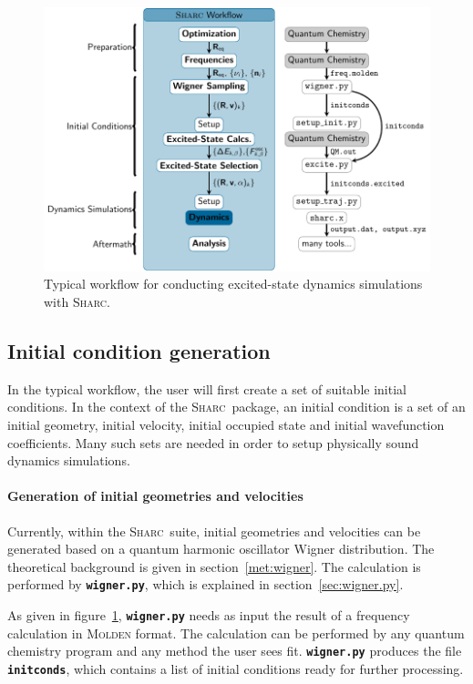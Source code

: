 \documentclass[a4paper,11pt,DIV=15,openany,twoside=false]{scrbook}
\newcommand{\sharc}{\textsc{Sharc}}
\newcommand{\ttt}[1]{\textbf{\texttt{#1}}}
\begin{document}
\begin{figure}[h!]
  \centering
  \includegraphics[scale=1]{img/workflow/prepare.pdf}
  \caption{Typical workflow for conducting excited-state dynamics simulations with \sharc.}
  \label{fig:workflow}
\end{figure}

\subsection{Initial condition generation}

In the typical workflow, the user will first create a set of suitable initial conditions. In the context of the \sharc\ package, an initial condition is a set of an initial geometry, initial velocity, initial occupied state and initial wavefunction coefficients. 
Many such sets are needed in order to setup physically sound dynamics simulations.

\paragraph{Generation of initial geometries and velocities}

Currently, within the \sharc\ suite, initial geometries and velocities can be generated based on a quantum harmonic oscillator Wigner distribution. The theoretical background is given in section~\ref{met:wigner}. The calculation is performed by \ttt{wigner.py}, which is explained in section~\ref{sec:wigner.py}. 

As given in figure~\ref{fig:workflow}, \ttt{wigner.py} needs as input the result of a frequency calculation in \textsc{Molden} format. The calculation can be performed by any quantum chemistry program and any method the user sees fit. 
\ttt{wigner.py} produces the file \ttt{initconds}, which contains a list of initial conditions ready for further processing.
\end{document}
